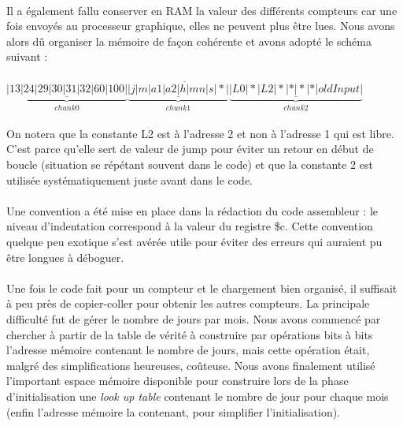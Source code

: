\documentclass{article}
\begin{document}
\paragraph{}Il a également fallu conserver en RAM la valeur des différents compteurs car une fois envoyés au processeur graphique, elles ne peuvent plus être lues. Nous avons alors dû organiser la mémoire de façon cohérente et avons adopté le schéma suivant :

\paragraph{}$\overline{\underbrace{\underline{|13|24|29|30|31|32|60|100|}}_{chunk 0}\underbrace{\underline{|j|m|a1|a2|h|mn|s|*|}}_{chunk 1}\underbrace{\underline{|L0|*|L2|*|*|*|*|oldInput|}}_{chunk 2}}$

\paragraph{}On notera que la constante L2 est à l'adresse 2 et non à l'adresse 1 qui est libre. C'est parce qu'elle sert de valeur de jump pour éviter un retour en début de boucle (situation se répétant souvent dans le code) et que la constante 2 est utilisée systématiquement juste avant dans le code.

\paragraph{}Une convention a été mise en place dans la rédaction du code assembleur : le niveau d'indentation correspond à la valeur du registre \$c. Cette convention quelque peu exotique s'est avérée utile pour éviter des erreurs qui auraient pu être longues à déboguer.

\paragraph{}Une fois le code fait pour un compteur et le chargement bien organisé, il suffisait à peu près de copier-coller pour obtenir les autres compteurs. La principale difficulté fut de gérer le nombre de jours par mois. Nous avons commencé par chercher à partir de la table de vérité à construire par opérations bits à bits l'adresse mémoire contenant le nombre de jours, mais cette opération était, malgré des simplifications heureuses, coûteuse. Nous avons finalement utilisé l'important espace mémoire disponible pour construire lors de la phase d'initialisation une \emph{look up table} contenant le nombre de jour pour chaque mois (enfin l'adresse mémoire la contenant, pour simplifier l'initialisation).
\end{document}
